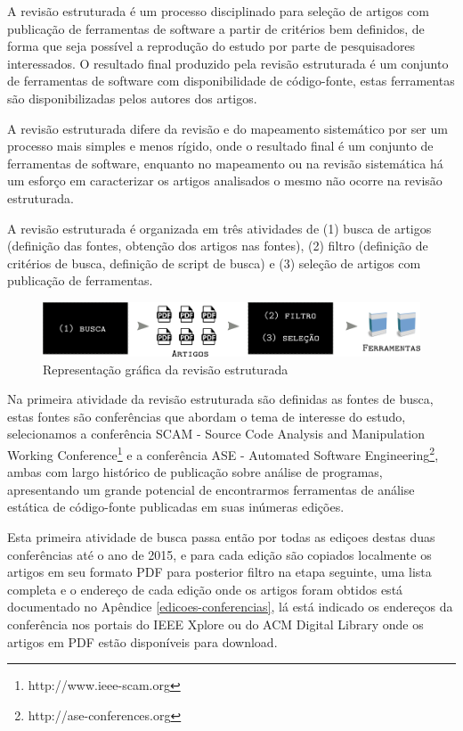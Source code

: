  \label{revisao-estruturada}

A revisão estruturada é um processo disciplinado para seleção de artigos com
publicação de ferramentas de software a partir de critérios bem definidos, de
forma que seja possível a reprodução do estudo por parte de pesquisadores
interessados. O resultado final produzido pela revisão estruturada é um conjunto
de ferramentas de software com disponibilidade de código-fonte, estas ferramentas
são disponibilizadas pelos autores dos artigos.

A revisão estruturada difere da revisão e do mapeamento sistemático
por ser um processo mais simples e menos rígido, onde o resultado final é
um conjunto de ferramentas de software, enquanto no mapeamento ou na revisão
sistemática há um esforço em caracterizar os artigos analisados o mesmo
não ocorre na revisão estruturada.

A revisão estruturada é organizada em três atividades de (1) busca de artigos
(definição das fontes, obtenção dos artigos nas fontes), (2) filtro
(definição de critérios de busca, definição de script de busca) e (3) seleção
de artigos com publicação de ferramentas.

\begin{figure}[h]
  \center
  \includegraphics[scale=0.33]{imagens/revisao-estruturada.png}
  \caption{Representação gráfica da revisão estruturada}
  \label{figura-revisao-estruturada}
\end{figure}

Na primeira atividade da revisão estruturada são definidas as fontes de busca, estas fontes
são conferências que abordam o tema de interesse do estudo, selecionamos a
conferência SCAM - Source Code Analysis and Manipulation Working
Conference\footnote{http://www.ieee-scam.org} e a conferência ASE - Automated
Software Engineering\footnote{http://ase-conferences.org}, ambas com largo
histórico de publicação sobre análise de programas, apresentando um grande
potencial de encontrarmos ferramentas de análise estática de código-fonte
publicadas em suas inúmeras edições.

Esta primeira atividade de busca passa então por todas as ediçoes destas duas
conferências até o ano de 2015, e para cada edição são copiados localmente os
artigos em seu formato PDF para posterior filtro na etapa seguinte, uma lista
completa e o endereço de cada edição onde os artigos foram obtidos está
documentado no Apêndice \ref{edicoes-conferencias}, lá está indicado os
endereços da conferência nos portais do IEEE Xplore ou do ACM Digital Library
onde os artigos em PDF estão disponíveis para download.

